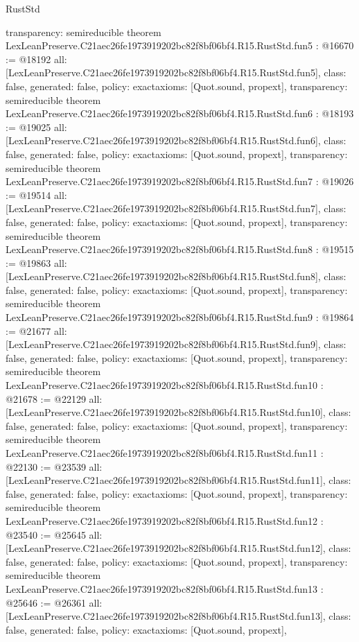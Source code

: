 \begin{lexlean}{RustStd}
\begin{coremodule}
{  transparency: semireducible
}
theorem LexLeanPreserve.C21aec26fe1973919202bc82f8bf06bf4.R15.RustStd.fun5 : @16670 := @18192 {
  all: [LexLeanPreserve.C21aec26fe1973919202bc82f8bf06bf4.R15.RustStd.fun5],
  class: false,
  generated: false,
  policy: exact{axioms: [Quot.sound, propext]},
  transparency: semireducible
}
theorem LexLeanPreserve.C21aec26fe1973919202bc82f8bf06bf4.R15.RustStd.fun6 : @18193 := @19025 {
  all: [LexLeanPreserve.C21aec26fe1973919202bc82f8bf06bf4.R15.RustStd.fun6],
  class: false,
  generated: false,
  policy: exact{axioms: [Quot.sound, propext]},
  transparency: semireducible
}
theorem LexLeanPreserve.C21aec26fe1973919202bc82f8bf06bf4.R15.RustStd.fun7 : @19026 := @19514 {
  all: [LexLeanPreserve.C21aec26fe1973919202bc82f8bf06bf4.R15.RustStd.fun7],
  class: false,
  generated: false,
  policy: exact{axioms: [Quot.sound, propext]},
  transparency: semireducible
}
theorem LexLeanPreserve.C21aec26fe1973919202bc82f8bf06bf4.R15.RustStd.fun8 : @19515 := @19863 {
  all: [LexLeanPreserve.C21aec26fe1973919202bc82f8bf06bf4.R15.RustStd.fun8],
  class: false,
  generated: false,
  policy: exact{axioms: [Quot.sound, propext]},
  transparency: semireducible
}
theorem LexLeanPreserve.C21aec26fe1973919202bc82f8bf06bf4.R15.RustStd.fun9 : @19864 := @21677 {
  all: [LexLeanPreserve.C21aec26fe1973919202bc82f8bf06bf4.R15.RustStd.fun9],
  class: false,
  generated: false,
  policy: exact{axioms: [Quot.sound, propext]},
  transparency: semireducible
}
theorem LexLeanPreserve.C21aec26fe1973919202bc82f8bf06bf4.R15.RustStd.fun10 : @21678 := @22129 {
  all: [LexLeanPreserve.C21aec26fe1973919202bc82f8bf06bf4.R15.RustStd.fun10],
  class: false,
  generated: false,
  policy: exact{axioms: [Quot.sound, propext]},
  transparency: semireducible
}
theorem LexLeanPreserve.C21aec26fe1973919202bc82f8bf06bf4.R15.RustStd.fun11 : @22130 := @23539 {
  all: [LexLeanPreserve.C21aec26fe1973919202bc82f8bf06bf4.R15.RustStd.fun11],
  class: false,
  generated: false,
  policy: exact{axioms: [Quot.sound, propext]},
  transparency: semireducible
}
theorem LexLeanPreserve.C21aec26fe1973919202bc82f8bf06bf4.R15.RustStd.fun12 : @23540 := @25645 {
  all: [LexLeanPreserve.C21aec26fe1973919202bc82f8bf06bf4.R15.RustStd.fun12],
  class: false,
  generated: false,
  policy: exact{axioms: [Quot.sound, propext]},
  transparency: semireducible
}
theorem LexLeanPreserve.C21aec26fe1973919202bc82f8bf06bf4.R15.RustStd.fun13 : @25646 := @26361 {
  all: [LexLeanPreserve.C21aec26fe1973919202bc82f8bf06bf4.R15.RustStd.fun13],
  class: false,
  generated: false,
  policy: exact{axioms: [Quot.sound, propext]},
}
\end{coremodule}
\end{lexlean}

